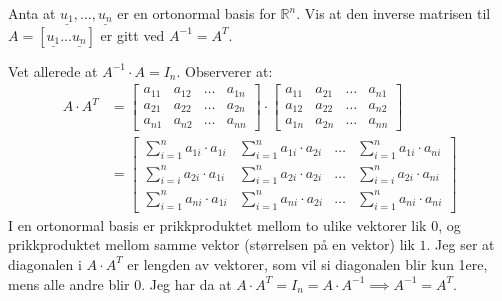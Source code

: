 \documentclass[11pt, a4paper, norsk]{NTNUoving}
\begin{document}
    \begin{oppgave}
        Anta at $\underline{u_1}, \dots ,\underline{u_{n}}$ er en ortonormal basis for $\mathbb{R}^{n}$. Vis at den inverse matrisen til $A = [\underline{u_1} \dots \underline{u_{n}}]$ er gitt ved $A^{-1} = A^{T}$.

        Vet allerede at $A^{-1} \cdot A = I_{n}$. Observerer at:
        \begin{align*}
            A \cdot A^{T} &= \begin{bmatrix}
                a_{11} & a_{12} & \dots & a_{1n} \\
                a_{21} & a_{22} & \dots & a_{2n} \\
                a_{n1} & a_{n2} & \dots & a_{nn}
            \end{bmatrix} \cdot \begin{bmatrix}
                a_{11} & a_{21} & \dots & a_{n1} \\
                a_{12} & a_{22} & \dots & a_{n2} \\
                a_{1n} & a_{2n} & \dots & a_{nn}
            \end{bmatrix}
            \\
                          &= \begin{bmatrix}
                              \sum_{i=1}^{n} a_{1i} \cdot a_{1i} & \sum_{i=1}^{n}a_{1i} \cdot a_{2i} & \dots & \sum_{i=1}^{n}a_{1i} \cdot a_{ni} \\
                              \sum_{i=i}^{n}a_{2i} \cdot a_{1i} & \sum_{i=1}^{n} a_{2i} \cdot a_{2i} & \dots & \sum_{i=i}^{n} a_{2i} \cdot a_{ni}
                              \\
                              \sum_{i=1}^{n}a_{ni} \cdot a_{1i} & \sum_{i=1}^{n}a_{ni} \cdot a_{2i} & \dots & \sum_{i=1}^{n}a_{ni} \cdot a_{ni}
                          \end{bmatrix}
        \end{align*}
        I en ortonormal basis er prikkproduktet mellom to ulike vektorer lik $0$, og prikkproduktet mellom samme vektor (størrelsen på en vektor) lik $1$. Jeg ser at diagonalen i $A \cdot A^{T}$ er lengden av vektorer, som vil si diagonalen blir kun 1ere, mens alle andre blir $0$. Jeg har da at $A \cdot A^{T} = I_{n} = A \cdot A^{-1} \implies A^{-1} = A^{T}$.
    \end{oppgave}
\end{document}
